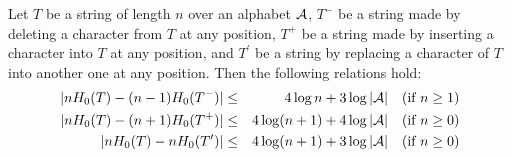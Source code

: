 \documentclass{llncs}
\begin{document}
\begin{lemma}\label{lemma:1}
Let $T$ be a string of length $n$ over an alphabet ${\cal A}$, 
$T^-$ be a string made by deleting a character from $T$
at any position, $T^+$ be a string made by inserting a character into $T$
at any position,
and $T^\prime$ be a string by replacing a character of $T$ into another one
at any position.
Then the following relations hold:
\begin{eqnarray}
| nH_0(T) - (n-1)H_0(T^-) | &\le& 4 \log n + 3 \log |{\cal A}| \quad (\mbox{if $n \ge 1$}) \\
| nH_0(T) - (n+1)H_0(T^+) | &\le& 4 \log (n+1) + 4 \log |{\cal A}| \quad (\mbox{if $n \ge 0$}) \\
| nH_0(T) - nH_0(T^\prime) | &\le& 4 \log (n+1) + 3 \log |{\cal A}| \quad (\mbox{if $n \ge 0$})
\end{eqnarray}
\end{lemma}
\end{document}
